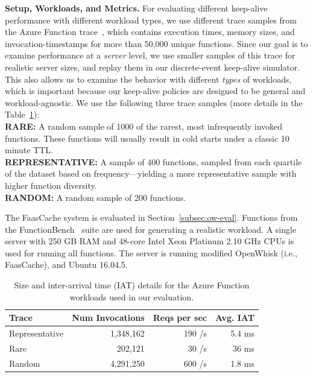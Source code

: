 \noindent \textbf{Setup, Workloads, and Metrics.}
%
For evaluating different keep-alive performance with different workload types, we use different trace samples from the Azure Function trace~\cite{shahrad_serverless_2020}, which contains execution times, memory sizes, and invocation-timestamps for more than 50,000 unique functions. 
Since our goal is to examine performance at a \emph{server} level, we use smaller samples of this trace for realistic server sizes, and replay them in our discrete-event keep-alive simulator. 
This also allows us to examine the behavior with different \emph{types} of workloads, which is important because our keep-alive policies are designed to be general and workload-agnostic.
We use the following three trace samples (more details in the Table~\ref{tab:trace-deets}): \\
\noindent \textbf{RARE:} A random sample of 1000 of the rarest, most infrequently invoked functions. These functions will usually result in cold starts under a classic 10 minute TTL.  \\
\noindent \textbf{REPRESENTATIVE:} A sample of 400 functions, sampled from each quartile of the dataset based on frequency---yielding a more representative sample with higher function diversity. \\
\noindent \textbf{RANDOM:} A random sample of 200 functions.

The FaasCache system is evaluated in Section~\ref{subsec:ow-eval}.
Functions from the FunctionBench~\cite{kim_functionbench_2019} suite are used for generating a realistic workload. 
A single server with 250 GB RAM and 48-core Intel Xeon Platinum 2.10 GHz CPUs is used for running all functions. The server is running modified OpenWhisk (i.e., FaasCache), and Ubuntu 16.04.5. 

\begin{table}
  \caption{Size and inter-arrival time (IAT) details for the Azure Function workloads used in our evaluation.}
  \begin{tabular}{lrrr}
    \hline 
    Trace & Num Invocations & Reqs per sec & Avg. IAT \\
    \hline
    Representative & 1,348,162 & 190 /s & 5.4 ms \\
    Rare & 202,121 & 30 /s & 36 ms \\
    Random & 4,291,250 & 600 /s & 1.8 ms \\
    \hline
  \end{tabular}
  \label{tab:trace-deets}
\end{table}



